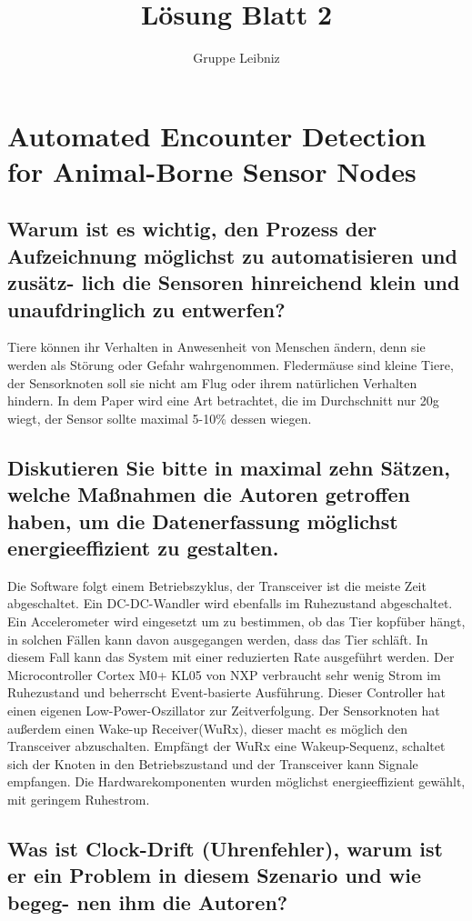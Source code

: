 \documentclass[11pt]{scrartcl}
\title{Lösung Blatt 2}
\author{Gruppe Leibniz}
\begin{document}
\maketitle

\section{Automated Encounter Detection for Animal-Borne Sensor Nodes}
\subsection{Warum ist es wichtig, den Prozess der Aufzeichnung möglichst zu automatisieren und zusätz-
lich die Sensoren hinreichend klein und unaufdringlich zu entwerfen?}
Tiere können ihr Verhalten in Anwesenheit von Menschen ändern, denn sie werden als Störung oder Gefahr wahrgenommen.
Fledermäuse sind kleine Tiere, der Sensorknoten soll sie nicht am Flug oder ihrem natürlichen Verhalten hindern. In dem Paper wird eine Art betrachtet, die im Durchschnitt nur 20g wiegt, der Sensor sollte maximal 5-10\% dessen wiegen.
\subsection{Diskutieren Sie bitte in maximal zehn Sätzen, welche Maßnahmen die Autoren getroffen haben,
um die Datenerfassung möglichst energieeffizient zu gestalten.}
Die Software folgt einem Betriebszyklus, der Transceiver ist die meiste Zeit abgeschaltet. Ein DC-DC-Wandler wird ebenfalls im Ruhezustand abgeschaltet. Ein Accelerometer wird eingesetzt um zu bestimmen, ob das Tier kopfüber hängt, in solchen Fällen kann davon ausgegangen werden, dass das Tier schläft. In diesem Fall kann das System mit einer reduzierten Rate ausgeführt werden. Der Microcontroller Cortex M0+ KL05 von NXP verbraucht sehr wenig Strom im Ruhezustand und beherrscht Event-basierte Ausführung. Dieser Controller hat einen eigenen Low-Power-Oszillator zur Zeitverfolgung.
Der Sensorknoten hat außerdem einen Wake-up Receiver(WuRx), dieser macht es möglich den Transceiver abzuschalten. Empfängt der WuRx eine Wakeup-Sequenz, schaltet sich der Knoten in den Betriebszustand und der Transceiver kann Signale empfangen.
Die Hardwarekomponenten wurden möglichst energieeffizient gewählt, mit geringem Ruhestrom.

\subsection{Was ist Clock-Drift (Uhrenfehler), warum ist er ein Problem in diesem Szenario und wie begeg-
nen ihm die Autoren?}
\end{document}
